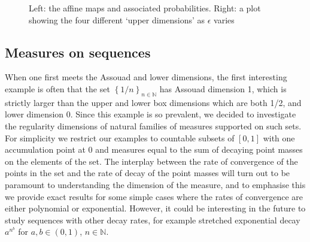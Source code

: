 \begin{figure}[H]
\begin{minipage}{.5\textwidth}
		
	\end{minipage}
	
	\caption{Left: the affine maps and associated probabilities.  Right: a plot showing the four different `upper dimensions' as $\epsilon$ varies}
	\label{ch-upper-reg:fig:badcarpet}
\end{figure}




\subsection{Measures on sequences}\label{ch-upper-reg:sec:sequences}

When one first meets the Assouad and lower dimensions, the first interesting example is often that the set $\left\{1/n \right\}_{n\in \mathbb{N}}$ has Assouad dimension 1, which is strictly larger than the upper and lower box dimensions which are both 1/2, and lower dimension 0. Since this example is so prevalent, we decided to investigate the regularity dimensions of natural families of measures supported on such sets. For simplicity we restrict our examples to countable subsets of $[0,1]$ with one accumulation point at 0 and measures equal to the sum of decaying point masses on the elements of the set. The interplay between the rate of convergence of the points in the set and the rate of decay of the point masses will turn out to be paramount to understanding the dimension of the measure, and to emphasise this we provide exact results for some simple cases where the rates of convergence are either polynomial or exponential.  However, it could be interesting in the future to study  sequences with other decay rates, for example  stretched exponential decay $a^{n^b}$ for $a,b \in (0,1)$, $n \in \mathbb{N}$.

